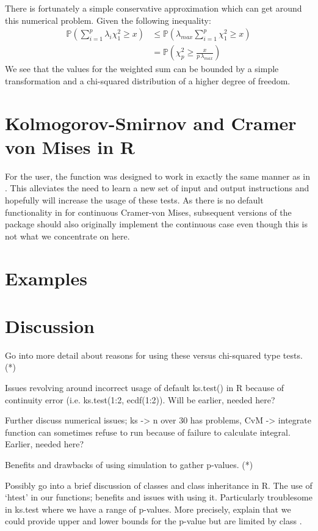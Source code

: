 \documentclass[article]{jss}
\begin{document}
There is fortunately a simple conservative approximation which can get around this numerical problem. Given the
following inequality:
\begin{align*}
\mathbb{P} \left(\sum_{i=1}^{p} \lambda_i \chi^2_1 \geq x \right) &\leq \mathbb{P} \left( \lambda_{max} \sum_{i=1}^{p} \chi^2_1 \geq x \right) \\
&= \mathbb{P} \left(\chi^2_p \geq \frac{x}{p \, \lambda_{max}} \right)
\end{align*}
We see that the values for the weighted sum can be bounded by a simple transformation and a chi-squared distribution
of a higher degree of freedom. 

\section{Kolmogorov-Smirnov and Cramer von Mises in R}

For the user, the function  was designed to work in exactly the same manner as  in . This
alleviates the need to learn a new set of input and output instructions and hopefully will increase the usage of these tests. 
As there is no default functionality in  for continuous Cramer-von Mises, subsequent versions of the package
should also originally implement the continuous case even though this is not what we concentrate on here. 

\section{Examples}

\section{Discussion}

Go into more detail about reasons for using these versus chi-squared type tests. (*) 

Issues revolving around incorrect usage of default ks.test() in R because of continuity error (i.e. ks.test(1:2, ecdf(1:2)).  Will be earlier, needed here?

Further discuss numerical issues; ks -> n over 30 has problems, CvM -> integrate function can sometimes refuse to run because of failure to calculate integral.
Earlier, needed here?

Benefits and drawbacks of using simulation to gather p-values. (*)

Possibly go into a brief discussion of classes and class inheritance in R. The use of `htest' in our functions; benefits and issues with using it. Particularly troublesome in ks.test where we have a range of p-values.  More precisely, explain that we
could provide upper and lower bounds for the p-value but are limited by class
.
\end{document}
